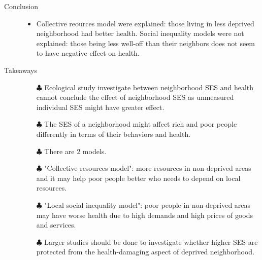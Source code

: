 \documentclass{article}
\begin{document}
\begin{itemize}
\begin{description}
			\item[Conclusion] \mbox{}\par
				\begin{itemize}
					\item Collective reources model were explained: those living in less deprived neighborhood had better health. Social inequality models were not explained: those being less well-off than their neighbors does not seem to have negative effect on health.
				\end{itemize}
			\item[Takeaways] \mbox{}\par
				\begin{itemize}
					\item[$\clubsuit$] Ecological study investigate between neighborhood SES and health cannot conclude the effect of neighborhood SES as unmeasured individual SES might have greater effect.
					\item[$\clubsuit$] The SES of a neighborhood might affect rich and poor people differently in terms of their behaviors and health.
					\item[$\clubsuit$] There are 2 models.
					\item[$\clubsuit$] "Collective resources model": more resources in non-deprived areas and it may help poor people better who needs to depend on local resources.
					\item[$\clubsuit$] "Local social inequality model": poor people in non-deprived areas may have worse health due to high demands and high prices of goods and services. 
					\item[$\clubsuit$] Larger studies should be done to investigate whether higher SES are protected from the health-damaging aspect of deprived neighborhood.
				\end{itemize}
		\end{description}

\end{itemize}
\end{document}
